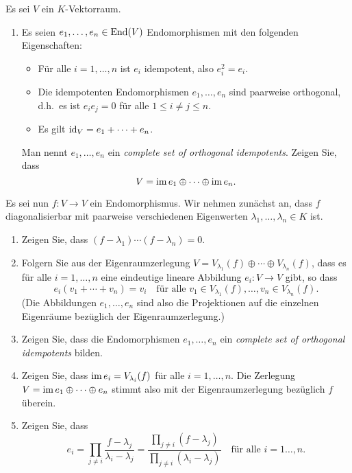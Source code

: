 \begin{question}
  Es sei $V$ ein $K$-Vektorraum.
  \begin{enumerate}[leftmargin=*]
    \item
      Es seien $e_1, \dotsc, e_n \in \operatorname{End}(V)$ Endomorphismen mit den folgenden Eigenschaften:
      \begin{itemize}
        \item
          Für alle $i = 1, \dotsc, n$ ist $e_i$ idempotent, also $e_i^2 = e_i$.
        \item
          Die idempotenten Endomorphismen $e_1, \dotsc, e_n$ sind paarweise orthogonal, d.h.\ es ist $e_i e_j = 0$ für alle $1 \leq i \neq j \leq n$.
        \item
          Es gilt $\operatorname{id}_V = e_1 + \dotsb + e_n$.
      \end{itemize}
      Man nennt $e_1, \dotsc, e_n$ ein \emph{complete set of orthogonal idempotents}.
      Zeigen Sie, dass
      \[
        V = \operatorname{im} e_1 \oplus \dotsb \oplus \operatorname{im} e_n.
      \]
  \end{enumerate}
  Es sei nun $f \colon V \to V$ ein Endomorphismus.
  Wir nehmen zunächst an, dass $f$ diagonalisierbar mit paarweise verschiedenen Eigenwerten $\lambda_1, \dotsc, \lambda_n \in K$ ist.
  \begin{enumerate}[resume]
    \item
      Zeigen Sie, dass $(f - \lambda_1) \dotsm (f - \lambda_n) = 0$.
    \item
      Folgern Sie aus der Eigenraumzerlegung $V = V_{\lambda_1}(f) \oplus \dotsb \oplus V_{\lambda_n}(f)$, dass es für alle $i = 1, \dotsc, n$ eine eindeutige lineare Abbildung $e_i \colon V \to V$ gibt, so dass
      \[
          e_i(v_1 + \dotsb + v_n)
        = v_i
        \quad
        \text{für alle $v_1 \in V_{\lambda_1}(f), \dotsc, v_n \in V_{\lambda_n}(f)$}.
      \]
      (Die Abbildungen $e_1, \dotsc, e_n$ sind also die Projektionen auf die einzelnen Eigenräume bezüglich der Eigenraumzerlegung.)
    \item
      Zeigen Sie, dass die Endomorphismen $e_1, \dotsc, e_n$ ein \emph{complete set of orthogonal idempotents} bilden.
    \item
      Zeigen Sie, dass $\operatorname{im} e_i = V_{\lambda_i}(f)$ für alle $i = 1, \dotsc, n$.
      Die Zerlegung $V = \operatorname{im} e_1 \oplus \dotsb \oplus e_n$ stimmt also mit der Eigenraumzerlegung bezüglich $f$ überein.
    \item
      Zeigen Sie, dass
      \[
          e_i
        = \prod_{j \neq i} \frac{f - \lambda_j}{\lambda_i - \lambda_j}
        = \frac{\prod_{j \neq i} (f-\lambda_j)}{\prod_{j \neq i} (\lambda_i - \lambda_j)}
        \quad
        \text{für alle $i = 1 \dotsc, n$}.
      \]
      

\end{enumerate}
\end{question}
